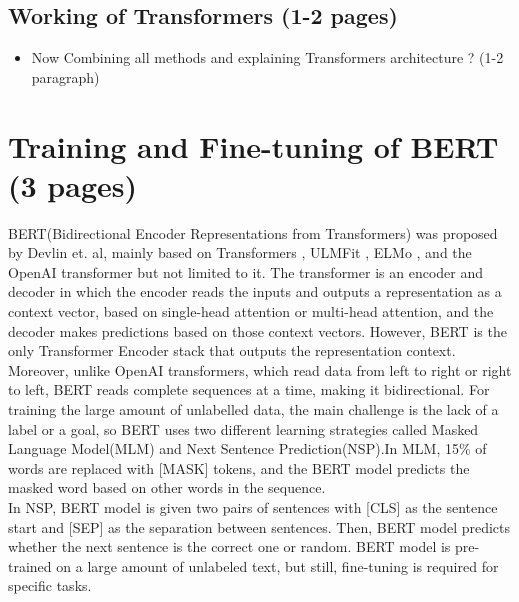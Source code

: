 \documentclass[%
	BCOR=8mm, %
	DIV=12, 
	toc=bibliography, %
	toc=listof, %
	oneside, %
	egregdoesnotlikesansseriftitles, %
	]{scrbook}
\begin{document}
\subsection{ Working of Transformers (1-2 pages)}
\begin{itemize}
\item Now Combining all methods and explaining Transformers architecture ? (1-2 paragraph)
\end{itemize}



\section{Training and Fine-tuning of BERT (3 pages)}
BERT(Bidirectional Encoder Representations from Transformers) was proposed by Devlin et$.$ al\cite{devlin_bert_2019}, mainly based on Transformers \cite{vaswani_attention_2017}, 
ULMFit \cite{howard_universal_2018}, ELMo \cite{peters_deep_2018}, and the OpenAI transformer \cite{radford_improving_nodate} but not limited to it. 
The transformer is an encoder and decoder in which the encoder reads the inputs and outputs a representation as a context vector, based on single-head attention or multi-head attention, 
and the decoder makes predictions based on those context vectors. However, BERT is the only Transformer Encoder stack that outputs the representation context. Moreover, unlike 
OpenAI transformers, which read data from left to right or right to left, BERT reads complete sequences at a time, making it bidirectional. For training the large amount of unlabelled data, 
the main challenge is the lack of a label or a goal, so BERT uses two different learning strategies called Masked Language Model(MLM) and Next Sentence Prediction(NSP).In MLM, 15\% of 
words are replaced with [MASK] tokens, and the BERT model predicts the masked word based on other words in the sequence.\\

In NSP, BERT model is given two pairs of sentences with [CLS] as the sentence start and [SEP] as the separation between sentences. Then, BERT model predicts whether the next sentence 
is the correct one or random. BERT model is pre-trained on a large amount of unlabeled text, but still, fine-tuning is required for specific tasks.\\
\end{document}
